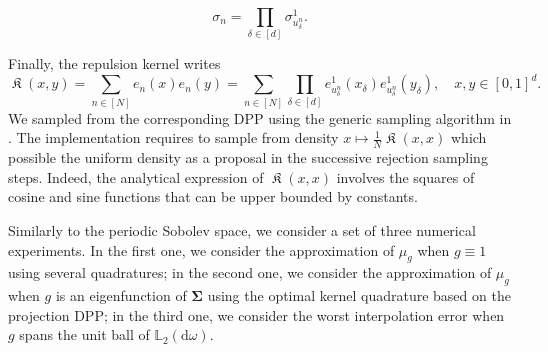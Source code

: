 \documentclass[twoside,11pt]{book}
\numberwithin{theorem}{chapter}
\numberwithin{definition}{chapter}
\numberwithin{proposition}{chapter}
\numberwithin{corollary}{chapter}
\numberwithin{example}{chapter}
\numberwithin{lemma}{chapter}
\numberwithin{assumption}{chapter}
\DeclareMathOperator*{\KDPP}{\mathfrak{K}}
\begin{document}
\begin{equation}
\sigma_{n} = \prod\limits_{\delta \in [d]} \sigma_{u_{\delta}^{n}}^{1}.
\end{equation}



Finally, the repulsion kernel writes
\begin{equation}
\KDPP(x,y) =\sum\limits_{n \in [N]} e_{n}(x)e_{n}(y) = \sum\limits_{n \in [N]} \prod\limits_{\delta \in [d]}e_{u^{n}_{\delta}}^{1} (x_{\delta}) e_{u^{n}_{\delta}}^{1} (y_{\delta}), \quad x,y\in [0,1]^d.
\end{equation}
We sampled from the corresponding DPP using the generic sampling algorithm in \cite{HoKrPeVi06}. The implementation requires to sample from density $x \mapsto \frac{1}{N} \KDPP(x,x)$ which possible the uniform density as a proposal in the successive rejection sampling steps. Indeed, the analytical expression of $\KDPP(x,x)$ involves the squares of cosine and sine functions that can be upper bounded by constants.


Similarly to the periodic Sobolev space, we consider a set of three numerical experiments. In the first one, we consider the approximation of $\mu_{g}$ when $g \equiv 1$ using several quadratures; in the second one, we consider the approximation of $\mu_{g}$ when $g$ is an eigenfunction of $\bm{\Sigma}$ using the optimal kernel quadrature based on the projection DPP; in the third one, we consider the worst interpolation error when $g$ spans the unit ball of $\mathbb{L}_{2}(\mathrm{d}\omega)$. 
\end{document}
